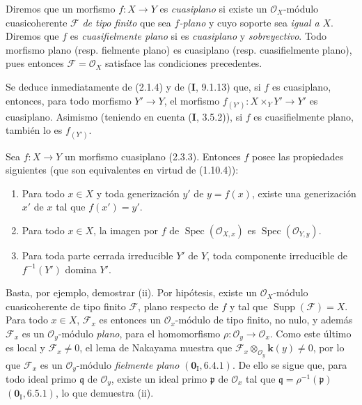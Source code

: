 \begin{env}[2.3.3]
\label{IV.2.3.3-fr}
Diremos que un morfismo $f:X\to Y$ es \emph{cuasiplano} si existe un
$\mathcal O_X$-módulo cuasicoherente $\mathscr F$ \emph{de tipo finito} que
sea \emph{$f$-plano} y cuyo soporte sea \emph{igual a} $X$. Diremos que $f$ es
\emph{cuasifielmente plano} si es \emph{cuasiplano} y \emph{sobreyectivo}. Todo morfismo
plano (resp. fielmente plano) es cuasiplano (resp. cuasifielmente plano), pues
entonces $\mathscr F=\mathcal O_X$ satisface las condiciones precedentes.
\end{env}

Se deduce inmediatamente de (2.1.4) y de (\textbf I, 9.1.13) que, si $f$ es
cuasiplano, entonces, para todo morfismo $Y'\to Y$, el morfismo
$f_{(Y')}:X\times_Y Y'\to Y'$ es cuasiplano. Asimismo (teniendo en cuenta
(\textbf I, 3.5.2)), si $f$ es cuasifielmente plano, también lo es $f_{(Y')}$.

\begin{proposition}[2.3.4]
Sea $f:X\to Y$ un morfismo cuasiplano \textup{(2.3.3)}. Entonces $f$ posee las
propiedades siguientes (que son equivalentes en virtud de \textup{(1.10.4)}):
\begin{enumerate}
  \item[\textup{(i)}] Para todo $x\in X$ y toda generización $y'$ de $y=f(x)$, existe
  una generización $x'$ de $x$ tal que $f(x')=y'$.
  \item[\textup{(ii)}] Para todo $x\in X$, la imagen por $f$ de
  $\operatorname{Spec}(\mathcal O_{X,x})$ es
  $\operatorname{Spec}(\mathcal O_{Y,y})$.
  \item[\textup{(iii)}] Para toda parte cerrada irreducible $Y'$ de $Y$, toda
  componente irreducible de $f^{-1}(Y')$ domina $Y'$.
\end{enumerate}
\end{proposition}

Basta, por ejemplo, demostrar (ii). Por hipótesis, existe un
$\mathcal O_X$-módulo cuasicoherente de tipo finito $\mathscr F$, plano
respecto de $f$ y tal que $\operatorname{Supp}(\mathscr F)=X$. Para todo
$x\in X$, $\mathscr F_x$ es entonces un $\mathcal O_x$-módulo de tipo
finito, no nulo, y además $\mathscr F_x$ es un $\mathcal O_y$-módulo
\emph{plano}, para el homomorfismo
$\rho:\mathcal O_y\to\mathcal O_x$. Como este último es local y
$\mathscr F_x\neq0$, el lema de Nakayama muestra que
$\mathscr F_x\otimes_{\mathcal O_y}\boldsymbol{k}(y)\neq0$, por lo que $\mathscr F_x$
es un $\mathcal O_y$-módulo \emph{fielmente plano}
$(\mathbf{0}_{\mathrm I},6.4.1)$. De ello se sigue que, para todo ideal primo
$\mathfrak q$ de $\mathcal O_y$, existe un ideal primo $\mathfrak p$ de
$\mathcal O_x$ tal que $\mathfrak q=\rho^{-1}(\mathfrak p)$
$(\mathbf{0}_{\mathrm I},6.5.1)$, lo que demuestra (ii).

